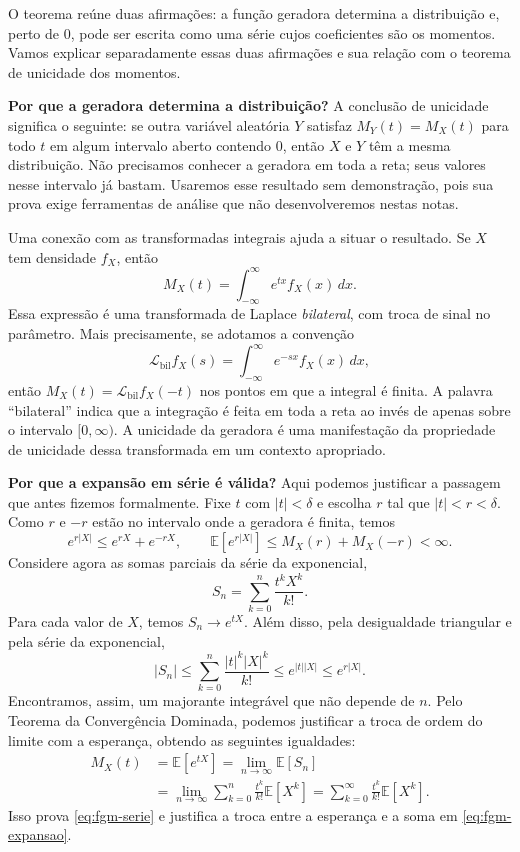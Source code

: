 \documentclass[12pt,portuguese]{article}
\theoremstyle{definition}
\theoremstyle{plainexercise}
\theoremstyle{starredexercise}
\theoremstyle{definition}
\begin{document}
O teorema reúne duas afirmações: a função geradora determina a distribuição
e, perto de $0$, pode ser escrita como uma série cujos coeficientes são
os momentos. Vamos explicar separadamente essas duas afirmações e sua
relação com o teorema de unicidade dos momentos.

\medskip
\noindent\textbf{Por que a geradora determina a distribuição?}
A conclusão de unicidade significa o seguinte: se outra variável aleatória
$Y$ satisfaz $M_Y(t)=M_X(t)$ para todo $t$ em algum intervalo aberto
contendo $0$, então $X$ e $Y$ têm a mesma distribuição. Não precisamos
conhecer a geradora em toda a reta; seus valores nesse intervalo já bastam.
Usaremos esse resultado sem demonstração, pois sua prova exige ferramentas
de análise que não desenvolveremos nestas notas.

Uma conexão com as transformadas integrais ajuda a situar o resultado.
Se $X$ tem densidade $f_X$, então
\[
M_X(t)=\int_{-\infty}^{\infty}e^{tx}f_X(x)\,dx.
\]
Essa expressão é uma transformada de Laplace \emph{bilateral}, com troca
de sinal no parâmetro. Mais precisamente, se adotamos a convenção
\[
\mathcal{L}_{\mathrm{bil}}f_X(s)
=\int_{-\infty}^{\infty}e^{-sx}f_X(x)\,dx,
\]
então $M_X(t)=\mathcal{L}_{\mathrm{bil}}f_X(-t)$ nos pontos em que a
integral é finita. A palavra ``bilateral'' indica que a integração é feita
em toda a reta ao invés de apenas sobre o intervalo $[0,\infty)$. 
A unicidade da geradora é uma manifestação da propriedade de unicidade dessa transformada
em um contexto apropriado. 


\medskip
\noindent\textbf{Por que a expansão em série é válida?}
Aqui podemos justificar a passagem que antes fizemos formalmente.
Fixe $t$ com $|t|<\delta$ e escolha $r$ tal que
$|t|<r<\delta$. Como $r$ e $-r$ estão no intervalo onde a geradora é
finita, temos
\[
e^{r|X|}\leqslant e^{rX}+e^{-rX},
\qquad
\mathbb{E}[e^{r|X|}]\leqslant M_X(r)+M_X(-r)<\infty.
\]
Considere agora as somas parciais da série da exponencial,
\[
S_n=\sum_{k=0}^{n}\frac{t^k X^k}{k!}.
\]
Para cada valor de $X$, temos $S_n\to e^{tX}$. Além disso, pela
desigualdade triangular e pela série da exponencial,
\[
|S_n|
\leqslant\sum_{k=0}^{n}\frac{|t|^k|X|^k}{k!}
\leqslant e^{|t||X|}
\leqslant e^{r|X|}.
\]
Encontramos, assim, um majorante integrável que não depende de $n$.
Pelo Teorema da Convergência Dominada, podemos justificar a troca de ordem
do limite com a esperança, obtendo as seguintes igualdades:
\begin{align*}
M_X(t)
&=\mathbb{E}[e^{tX}]
=\lim_{n\to\infty}\mathbb{E}[S_n]
\\[0.3cm]
&=\lim_{n\to\infty}\sum_{k=0}^{n}\frac{t^k}{k!}\mathbb{E}[X^k]
=\sum_{k=0}^{\infty}\frac{t^k}{k!}\mathbb{E}[X^k].
\end{align*}
Isso prova \eqref{eq:fgm-serie} e justifica a troca entre a esperança e
a soma em \eqref{eq:fgm-expansao}.
\end{document}
